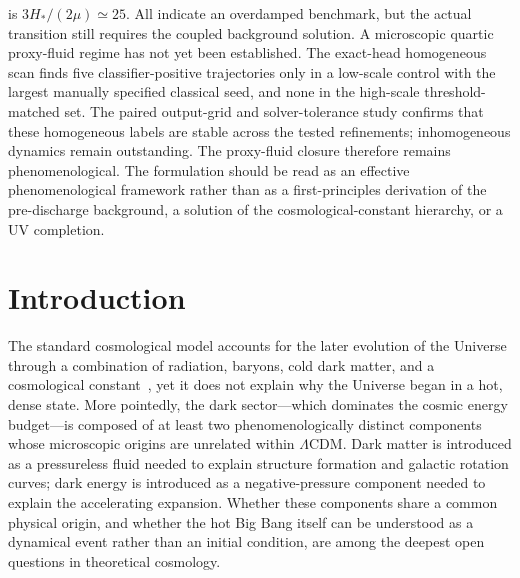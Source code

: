\documentclass[epj]{svjour}
\begin{document}
{is $3H_*/(2\mu)\simeq25$. All indicate an overdamped benchmark, but
the actual transition still requires the coupled background
solution. A microscopic quartic proxy-fluid regime has not yet been
established. The exact-head homogeneous scan finds five
classifier-positive trajectories only in a low-scale control with
the largest manually specified classical seed, and none in the
high-scale threshold-matched set. The paired output-grid and
solver-tolerance study confirms that these homogeneous labels are
stable across the tested refinements; inhomogeneous dynamics remain
outstanding. The proxy-fluid closure
therefore remains phenomenological. The formulation should be read as an effective phenomenological framework rather than as a first-principles derivation of the pre-discharge background, a solution of the cosmological-constant hierarchy, or a UV completion.%
} %
\maketitle

\section{Introduction}
\label{sec:intro}

The standard cosmological model accounts for the later evolution of
the Universe through a combination of radiation, baryons, cold dark
matter, and a cosmological constant~\cite{Planck2018params}, yet it
does not explain why the Universe began in a hot, dense state. More
pointedly, the dark sector---which dominates the cosmic energy
budget---is composed of at least two phenomenologically distinct
components whose microscopic origins are unrelated within
$\Lambda$CDM. Dark matter is introduced as a pressureless fluid
needed to explain structure formation and galactic rotation curves;
dark energy is introduced as a negative-pressure component needed to
explain the accelerating expansion. Whether these components share a
common physical origin, and whether the hot Big Bang itself can be
understood as a dynamical event rather than an initial condition, are
among the deepest open questions in theoretical cosmology.
\end{document}
